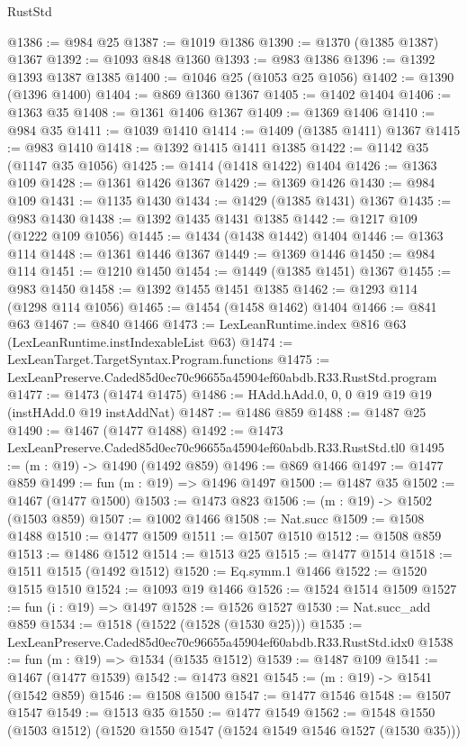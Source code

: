 \begin{lexlean}{RustStd}
\begin{coremodule}
@1386 := @984 @25
@1387 := @1019 @1386
@1390 := @1370 (@1385 @1387) @1367
@1392 := @1093 @848 @1360
@1393 := @983 @1386
@1396 := @1392 @1393 @1387 @1385
@1400 := @1046 @25 (@1053 @25 @1056)
@1402 := @1390 (@1396 @1400)
@1404 := @869 @1360 @1367
@1405 := @1402 @1404
@1406 := @1363 @35
@1408 := @1361 @1406 @1367
@1409 := @1369 @1406
@1410 := @984 @35
@1411 := @1039 @1410
@1414 := @1409 (@1385 @1411) @1367
@1415 := @983 @1410
@1418 := @1392 @1415 @1411 @1385
@1422 := @1142 @35 (@1147 @35 @1056)
@1425 := @1414 (@1418 @1422) @1404
@1426 := @1363 @109
@1428 := @1361 @1426 @1367
@1429 := @1369 @1426
@1430 := @984 @109
@1431 := @1135 @1430
@1434 := @1429 (@1385 @1431) @1367
@1435 := @983 @1430
@1438 := @1392 @1435 @1431 @1385
@1442 := @1217 @109 (@1222 @109 @1056)
@1445 := @1434 (@1438 @1442) @1404
@1446 := @1363 @114
@1448 := @1361 @1446 @1367
@1449 := @1369 @1446
@1450 := @984 @114
@1451 := @1210 @1450
@1454 := @1449 (@1385 @1451) @1367
@1455 := @983 @1450
@1458 := @1392 @1455 @1451 @1385
@1462 := @1293 @114 (@1298 @114 @1056)
@1465 := @1454 (@1458 @1462) @1404
@1466 := @841 @63
@1467 := @840 @1466
@1473 := LexLeanRuntime.index @816 @63 (LexLeanRuntime.instIndexableList @63)
@1474 := LexLeanTarget.TargetSyntax.Program.functions
@1475 := LexLeanPreserve.Caded85d0ec70c96655a45904ef60abdb.R33.RustStd.program
@1477 := @1473 (@1474 @1475)
@1486 := HAdd.hAdd.{0, 0, 0} @19 @19 @19 (instHAdd.{0} @19 instAddNat)
@1487 := @1486 @859
@1488 := @1487 @25
@1490 := @1467 (@1477 @1488)
@1492 := @1473 LexLeanPreserve.Caded85d0ec70c96655a45904ef60abdb.R33.RustStd.tl0
@1495 := (m : @19) -> @1490 (@1492 @859)
@1496 := @869 @1466
@1497 := @1477 @859
@1499 := fun (m : @19) => @1496 @1497
@1500 := @1487 @35
@1502 := @1467 (@1477 @1500)
@1503 := @1473 @823
@1506 := (m : @19) -> @1502 (@1503 @859)
@1507 := @1002 @1466
@1508 := Nat.succ
@1509 := @1508 @1488
@1510 := @1477 @1509
@1511 := @1507 @1510
@1512 := @1508 @859
@1513 := @1486 @1512
@1514 := @1513 @25
@1515 := @1477 @1514
@1518 := @1511 @1515 (@1492 @1512)
@1520 := Eq.symm.{1} @1466
@1522 := @1520 @1515 @1510
@1524 := @1093 @19 @1466
@1526 := @1524 @1514 @1509
@1527 := fun (i : @19) => @1497
@1528 := @1526 @1527
@1530 := Nat.succ_add @859
@1534 := @1518 (@1522 (@1528 (@1530 @25)))
@1535 := LexLeanPreserve.Caded85d0ec70c96655a45904ef60abdb.R33.RustStd.idx0
@1538 := fun (m : @19) => @1534 (@1535 @1512)
@1539 := @1487 @109
@1541 := @1467 (@1477 @1539)
@1542 := @1473 @821
@1545 := (m : @19) -> @1541 (@1542 @859)
@1546 := @1508 @1500
@1547 := @1477 @1546
@1548 := @1507 @1547
@1549 := @1513 @35
@1550 := @1477 @1549
@1562 := @1548 @1550 (@1503 @1512) (@1520 @1550 @1547 (@1524 @1549 @1546 @1527 (@1530 @35)))

\end{coremodule}
\end{lexlean}
